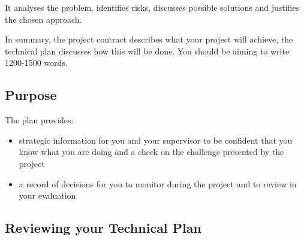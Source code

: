 \documentclass[a4paper,11pt]{techplan}
\begin{document}
It analyses the problem, identifies risks, discusses possible solutions and justifies the chosen approach.

In summary, the project contract describes what your project will achieve, the technical plan discusses how this will be done. You should be aiming to write 1200-1500 words.

\subsection*{Purpose}
The plan provides:
\begin{itemize}
    \item strategic information for you and your supervisor to be confident that you know what you are doing and a check on the challenge presented by the project
    \item a record of decisions for you to monitor during the project and to review in your evaluation
\end{itemize}

\subsection*{Reviewing your Technical Plan}
\end{document}
